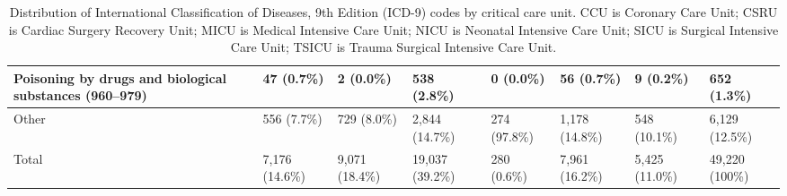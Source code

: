 \documentclass[english]{article}
\begin{document}
\begin{center}
\begin{table}
\begin{tabular}{|p{3.8cm}|p{1.2cm}|p{1.2cm}|p{1.2cm}|p{1.2cm}|p{1.2cm}|p{1.2cm}|p{1.2cm}|}
    \hline
    Poisoning by drugs and biological substances (960–979) 
    & 47 (0.7\%) & 2 (0.0\%) & 538 (2.8\%) & 0 (0.0\%) & 56 (0.7\%) & 9 (0.2\%) & 652 (1.3\%) \\ 
    \hline
    Other & 556 (7.7\%) & 729 (8.0\%) & 2,844 (14.7\%) & 274 (97.8\%) & 1,178 (14.8\%) & 548 (10.1\%) & 6,129 (12.5\%) \\ 
    \hline
    Total & 7,176 (14.6\%) & 9,071 (18.4\%) & 19,037 (39.2\%) & 280 (0.6\%) & 7,961 (16.2\%) & 5,425 (11.0\%) & 49,220 (100\%) \\ 
    \hline
\end{tabular}
\caption{Distribution of International Classification of Diseases, 9th Edition (ICD-9) codes by critical care unit. CCU is Coronary Care Unit; CSRU is Cardiac Surgery Recovery Unit; MICU is Medical Intensive Care Unit; NICU is Neonatal Intensive Care Unit; SICU is Surgical Intensive Care Unit; TSICU is Trauma Surgical Intensive Care Unit.}
\label{table:icddistribution}
\end{table}
\end{center}

\end{document}
